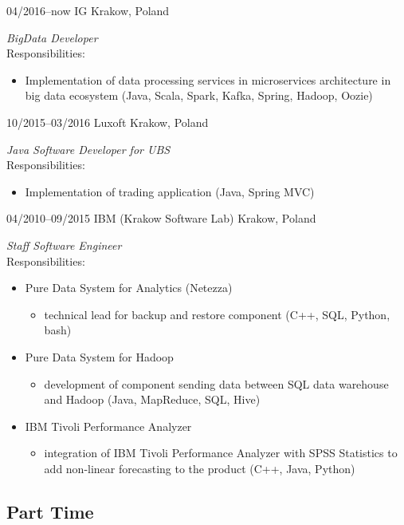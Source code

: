 \documentclass[]{gaza-cv} %
\begin{document}
\begin{entrylist}

\entry
{04/2016--now}
{IG}
{Krakow, Poland}
{\emph{ BigData Developer}\\
Responsibilities:
\begin{itemize}
\item Implementation of data processing services in microservices architecture in big data ecosystem (Java, Scala, Spark, Kafka, Spring, Hadoop, Oozie)
\end{itemize}}


\entry
{10/2015--03/2016}
{Luxoft}
{Krakow, Poland}
{\emph{Java Software Developer for UBS} \\
Responsibilities:
\begin{itemize}
\item Implementation of trading application (Java, Spring MVC)
\end{itemize}}


\entry
{04/2010--09/2015}
{IBM (Krakow Software Lab)}
{Krakow, Poland}
{\emph{Staff Software Engineer}\\
Responsibilities:
\begin{itemize}
\item Pure Data System for Analytics (Netezza)
\begin{itemize}
\item technical lead for backup and restore component (C++, SQL, Python, bash)
\end{itemize}
\item Pure Data System for Hadoop
\begin{itemize}
\item development of component sending data between SQL data warehouse and Hadoop (Java, MapReduce, SQL, Hive)
\end{itemize}
\item IBM Tivoli Performance Analyzer
\begin{itemize}
\item integration of IBM Tivoli Performance Analyzer with SPSS Statistics to add non-linear forecasting to the product (C++, Java, Python)
\end{itemize}
\end{itemize}}

\end{entrylist}

\subsection{Part Time}
\end{document}
